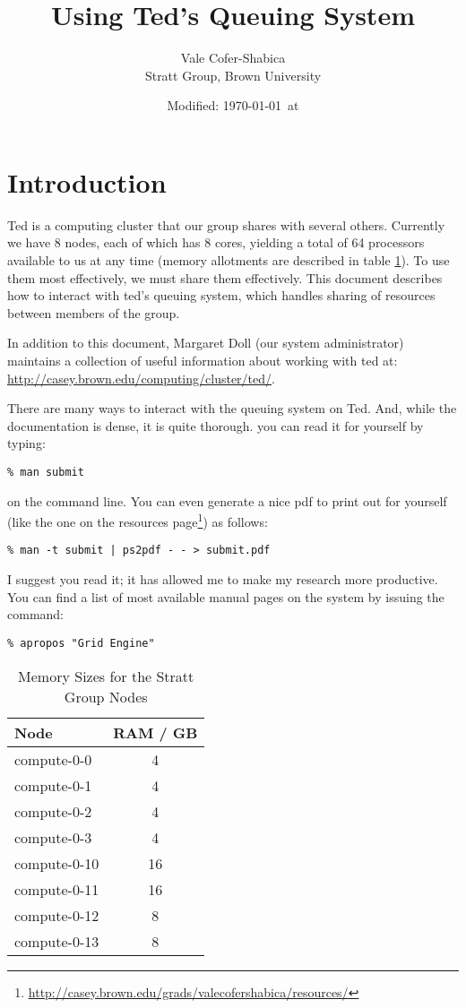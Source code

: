 \documentclass[letterpaper,12pt]{article}
\title{Using Ted's Queuing System}
\author{Vale Cofer-Shabica\\ Stratt Group, Brown University}
\date{Modified: \today\ at \currenttime}
\begin{document}
\maketitle

\section{Introduction}
Ted is a computing cluster that our group shares with several others. Currently we have 8 nodes, each of which has 8 cores, yielding a total of 64 processors available to us at any time (memory allotments are described in table \ref{tab:ram}). To use them most effectively, we must share them effectively. This document describes how to interact with ted's queuing system, which handles sharing of resources between members of the group.

In addition to this document, Margaret Doll (our system administrator) maintains a collection of useful information about working with ted at: \url{http://casey.brown.edu/computing/cluster/ted/}.

There are many ways to interact with the queuing system on Ted. And, while the documentation is dense, it is quite thorough. you can read it for yourself by typing:

\begin{verbatim}
% man submit
\end{verbatim}
on the command line. You can even generate a nice pdf to print out for yourself (like the one on the resources page\footnote{\url{http://casey.brown.edu/grads/valecofershabica/resources/}}) as follows:

\begin{verbatim}
% man -t submit | ps2pdf - - > submit.pdf 
\end{verbatim}
I suggest you read it; it has allowed me to make my research more productive. You can find a list of most available manual pages on the system by issuing the command:

\begin{verbatim}
% apropos "Grid Engine"
\end{verbatim}


\begin{table}
\begin{center}
\begin{tabular}{l c}
Node & RAM / GB \\
\hline
compute-0-0 & 4\\
compute-0-1 & 4\\
compute-0-2 & 4\\
compute-0-3 & 4\\
compute-0-10 & 16\\
compute-0-11 & 16\\
compute-0-12 & 8\\
compute-0-13 & 8\\
\end{tabular}
\caption{Memory Sizes for the Stratt Group Nodes}{\label{tab:ram}}
\end{center}
\end{table}
\end{document}
